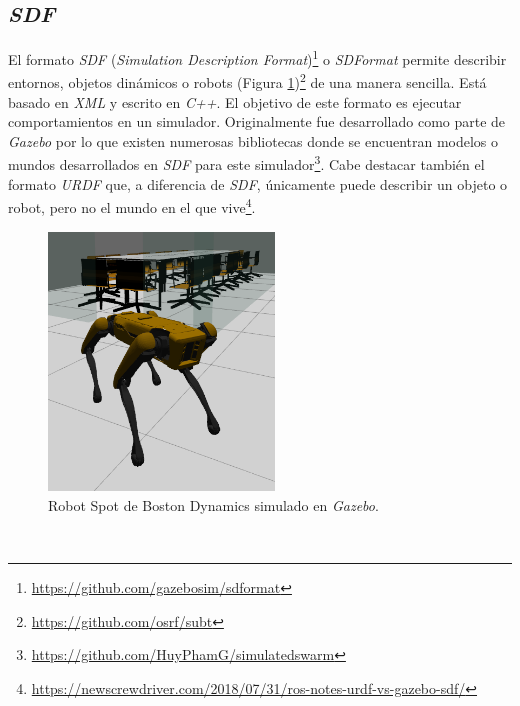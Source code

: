 \subsection{\textit{SDF}}
\label{subsection:sdf}
El formato \textit{SDF} (\textit{Simulation Description Format})\footnote{\url{https://github.com/gazebosim/sdformat}} o \textit{SDFormat} permite describir entornos, objetos dinámicos o robots (Figura \ref{fig:spot})\footnote{\url{https://github.com/osrf/subt}} de una manera sencilla. Está basado en \textit{XML} y escrito en \textit{C++}. El objetivo de este formato es ejecutar comportamientos en un simulador. Originalmente fue desarrollado como parte de \textit{Gazebo} por lo que existen numerosas bibliotecas donde se encuentran modelos o mundos desarrollados en \textit{SDF} para este simulador\footnote{\url{https://github.com/HuyPhamG/simulatedswarm}}. Cabe destacar también el formato \textit{URDF} que, a diferencia de \textit{SDF}, únicamente puede describir un objeto o robot, pero no el mundo en el que vive\footnote{\url{https://newscrewdriver.com/2018/07/31/ros-notes-urdf-vs-gazebo-sdf/}}.\\

\begin{figure} [h!]
	\begin{center}
		\includegraphics[width=6cm]{figs/spot}
	\end{center}
	\caption{Robot Spot de Boston Dynamics simulado en \textit{Gazebo}.}
	\label{fig:spot}
\end{figure}\

